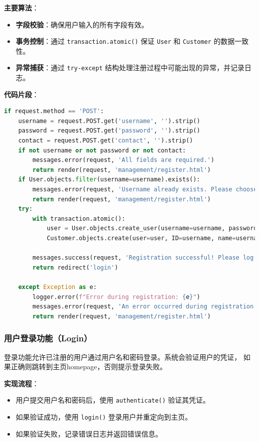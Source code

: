 \documentclass[UTF8,a4paper,12pt]{ctexart}
\begin{document}
\textbf{主要算法}：
\begin{itemize}
    \item \textbf{字段校验}：确保用户输入的所有字段有效。
    \item \textbf{事务控制}：通过 \texttt{transaction.atomic()} 保证 \texttt{User} 和 \texttt{Customer} 的数据一致性。
    \item \textbf{异常捕获}：通过 \texttt{try-except} 结构处理注册过程中可能出现的异常，并记录日志。
\end{itemize}

\textbf{代码片段}：
\begin{lstlisting}[language=Python]
if request.method == 'POST':
    username = request.POST.get('username', '').strip()
    password = request.POST.get('password', '').strip()
    contact = request.POST.get('contact', '').strip()
    if not username or not password or not contact:
        messages.error(request, 'All fields are required.')
        return render(request, 'management/register.html')
    if User.objects.filter(username=username).exists():
        messages.error(request, 'Username already exists. Please choose another one.')
        return render(request, 'management/register.html')
    try:
        with transaction.atomic():
            user = User.objects.create_user(username=username, password=password)
            Customer.objects.create(user=user, ID=username, name=username, contact=contact)

        messages.success(request, 'Registration successful! Please log in.')
        return redirect('login')

    except Exception as e:
        logger.error(f"Error during registration: {e}")
        messages.error(request, 'An error occurred during registration. Please try again.')
        return render(request, 'management/register.html')
\end{lstlisting}

\subsubsection{用户登录功能（Login）}
登录功能允许已注册的用户通过用户名和密码登录。系统会验证用户的凭证，
如果正确则跳转到主页homepage，否则提示登录失败。

\textbf{实现流程}：
\begin{itemize}
    \item 用户提交用户名和密码后，使用 \texttt{authenticate()} 验证其凭证。
    \item 如果验证成功，使用 \texttt{login()} 登录用户并重定向到主页。
    \item 如果验证失败，记录错误日志并返回错误信息。
\end{itemize}
\end{document}
